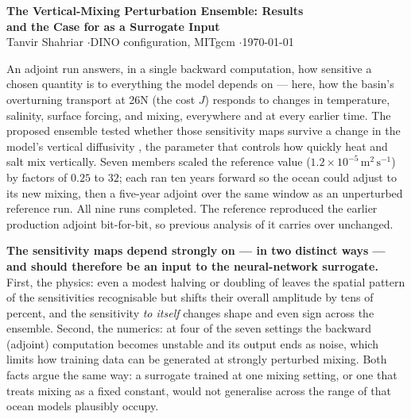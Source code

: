 \begin{center}
{\large\bfseries The Vertical-Mixing Perturbation Ensemble: Results\\[2pt]
 and the Case for \kv{} as a Surrogate Input}\\[3pt]
{\small Tanvir Shahriar \quad$\cdot$\quad DINO configuration, MITgcm
 \quad$\cdot$\quad \today}
\end{center}

An adjoint run answers, in a single backward computation, how sensitive a
chosen quantity is to everything the model depends on --- here, how the
basin's overturning transport at 26\dg N (the cost $J$) responds to changes in
temperature, salinity, surface forcing, and mixing, everywhere and at every
earlier time. The proposed ensemble tested whether those sensitivity maps
survive a change in the model's vertical diffusivity \kv, the parameter that
controls how quickly heat and salt mix vertically. Seven members scaled the
reference value ($1.2\times10^{-5}\,\mathrm{m^2\,s^{-1}}$) by factors of
$0.25$ to $32$; each ran ten years forward so the ocean could adjust to its
new mixing, then a five-year adjoint over the same window as an unperturbed
reference run. All nine runs completed. The reference reproduced the earlier
production adjoint bit-for-bit, so previous analysis of it carries over
unchanged.

\textbf{The sensitivity maps depend strongly on \kv{} --- in two distinct
ways --- and \kv{} should therefore be an input to the neural-network
surrogate.} First, the physics: even a modest halving or doubling of \kv{}
leaves the spatial pattern of the sensitivities recognisable but shifts their
overall amplitude by tens of percent, and the sensitivity \emph{to \kv{}
itself} changes shape and even sign across the ensemble. Second, the
numerics: at four of the seven settings the backward (adjoint) computation
becomes unstable and its output ends as noise, which limits how training data
can be generated at strongly perturbed mixing. Both facts argue the same way:
a surrogate trained at one mixing setting, or one that treats mixing as a
fixed constant, would not generalise across the range of \kv{} that ocean
models plausibly occupy.

